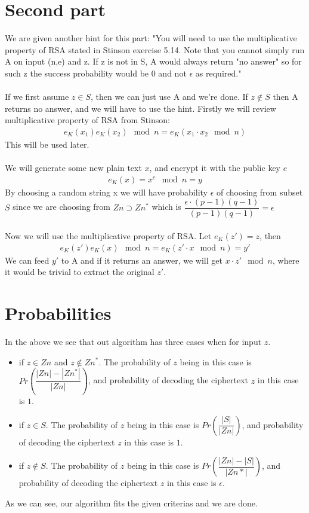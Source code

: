 \documentclass[paper=a4, fontsize=11pt]{scrartcl} %
\numberwithin{equation}{section} %
\numberwithin{figure}{section} %
\numberwithin{table}{section} %
\begin{document}
\section*{Second part}
We are given another hint for this part: "You will need to use the multiplicative property of RSA stated in Stinson exercise 5.14. Note that you cannot simply run A on input (n,e) and z. If z is not in S, A would always return "no answer" so for such z the success probability would be 0 and not $\epsilon$ as required."
\\ \\
If we first assume $z\in S$, then we can just use A and we're done. If $z\not\in S$ then A returns no answer, and we will have to use the hint. Firstly we will review multiplicative property of RSA from Stinson:
\begin{align*}
e_K(x_1)e_K(x_2)\mod{n}=e_K(x_1\cdot x_2\mod{n})
\end{align*}
This will be used later. 
\\ \\
We will generate some new plain text $x$, and encrypt it with the public key $e$
\begin{align*}
e_K(x)=x^e\mod{n}=y
\end{align*}
By choosing a random string x we will have probability $\epsilon$ of choosing from subset $S$ since we are choosing from $Zn\supset Zn^*$ which is $\dfrac{\epsilon\cdot(p-1)(q-1)}{(p-1)(q-1)}=\epsilon$
\\ \\ 
Now we will use the multiplicative property of RSA. Let $e_K(z')=z$, then
\begin{align*}
e_K(z')e_K(x)\mod{n}=e_K(z'\cdot x\mod{n})=y'
\end{align*}
We can feed $y'$ to A and if it returns an answer, we will get $x\cdot z'\mod{n}$, where it would be trivial to extract the original $z'$.
\section*{Probabilities}
In the above we see that out algorithm has three cases when for input $z$. 
\begin{itemize}
\item if $z\in Zn$ and $z\not\in Zn^*$. The probability of $z$ being in this case is $Pr(\dfrac{|Zn|-|Zn^*|}{|Zn|})$, and probability of decoding the ciphertext $z$ in this case is $1$.
\item if $z\in S$. The probability of $z$ being in this case is $Pr(\dfrac{|S|}{|Zn|})$, and probability of decoding the ciphertext $z$ in this case is $1$.
\item if $z\not\in S$. The probability of $z$ being in this case is $Pr(\dfrac{|Zn|-|S|}{|Zn*|})$, and probability of decoding the ciphertext $z$ in this case is $\epsilon$.
\end{itemize}
As we can see, our algorithm fits the given criterias and we are done.
\end{document}
